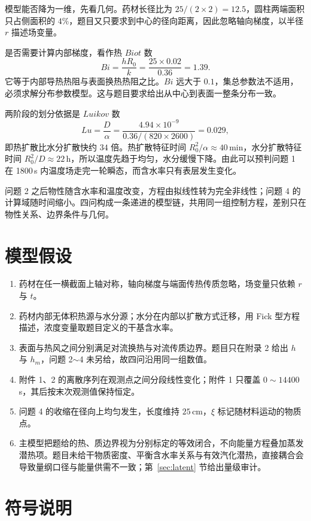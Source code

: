 \documentclass[12pt,a4paper]{ctexart}
\begin{document}
模型能否降为一维，先看几何。药材长径比为 $25/(2\times 2)=12.5$，圆柱两端面积只占侧面积的 $4\%$，题目又只要求到中心的径向距离，因此忽略轴向梯度，以半径 $r$ 描述场变量。

是否需要计算内部梯度，看作热 $Biot$ 数
\[
Bi=\frac{hR_0}{k}=\frac{25\times 0.02}{0.36}=1.39 .
\]
它等于内部导热热阻与表面换热热阻之比。$Bi$ 远大于 $0.1$，集总参数法不适用，必须求解分布参数模型。这与题目要求给出从中心到表面一整条分布一致。

两阶段的划分依据是 $Luikov$ 数
\[
Lu=\frac{D}{\alpha}=\frac{4.94\times10^{-9}}{0.36/(820\times2600)}=0.029 ,
\]
即热扩散比水分扩散快约 $34$ 倍。热扩散特征时间 $R_0^2/\alpha\approx 40$\,min，水分扩散特征时间 $R_0^2/D\approx 22$\,h，所以温度先趋于均匀，水分缓慢下降。由此可以预判问题 1 在 1800\,s 内温度场走完一轮瞬态，而含水率只有表层发生变化。

问题 2 之后物性随含水率和温度改变，方程由拟线性转为完全非线性；问题 4 的计算域随时间缩小。四问构成一条递进的模型链，共用同一组控制方程，差别只在物性关系、边界条件与几何。

\section{模型假设}

\begin{enumerate}
\item 药材在任一横截面上轴对称，轴向梯度与端面传热传质忽略，场变量只依赖 $r$ 与 $t$。
\item 药材内部无体积热源与水分源；水分在内部以扩散方式迁移，用 Fick 型方程描述，浓度变量取题目定义的干基含水率。
\item 表面与热风之间分别满足对流换热与对流传质边界。题目只在附录 2 给出 $h$ 与 $h_m$，问题 2$\sim$4 未另给，故四问沿用同一组数值。
\item 附件 1、2 的离散序列在观测点之间分段线性变化；附件 1 只覆盖 $0\sim14400$\,s，其后按末次观测值保持恒定。
\item 问题 4 的收缩在径向上均匀发生，长度维持 $25$\,cm，$\xi$ 标记随材料运动的物质点。
\item 主模型把题给的热、质边界视为分别标定的等效闭合，不向能量方程叠加蒸发潜热项。题目未给干物质密度、平衡含水率关系与有效汽化潜热，直接耦合会导致量纲口径与能量供需不一致；第~\ref{sec:latent} 节给出量级审计。
\end{enumerate}

\section{符号说明}
\end{document}
